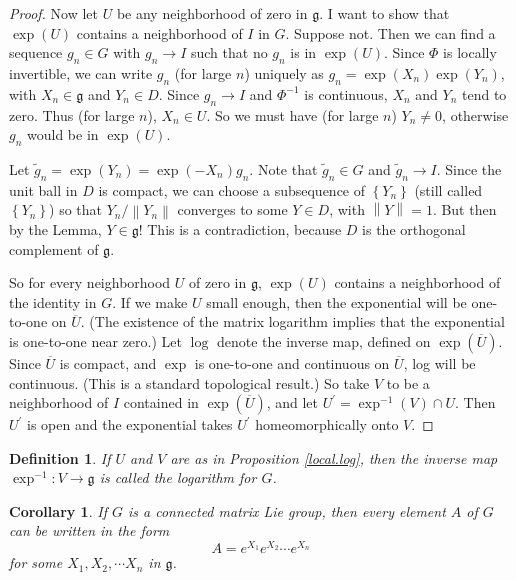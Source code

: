 \documentclass[12pt]{amsbook}
\let \frak = \mathfrak
\theoremstyle{plain}
\newtheorem{corollary}[theorem]{Corollary}
\newtheorem{definition}[theorem]{Definition}
\numberwithin{equation}{chapter}
\numberwithin{theorem}{chapter}
\begin{document}
\begin{proof}
Now let $U$ be any neighborhood of zero in $\frak{g}$. I want to show that
$\exp\left(  U\right)  $ contains a neighborhood of $I$ in $G$. Suppose not.
Then we can find a sequence $g_{n}\in G$ with $g_{n}\rightarrow I$ such that
no $g_{n}$ is in $\exp\left(  U\right)  $. Since $\Phi$ is locally invertible,
we can write $g_{n}$ (for large $n$) uniquely as $g_{n}=\exp\left(
X_{n}\right)  \exp\left(  Y_{n}\right)  $, with $X_{n}\in\frak{g}$ and
$Y_{n}\in D$. Since $g_{n}\rightarrow I$ and $\Phi^{-1}$ is continuous,
$X_{n}$ and $Y_{n}$ tend to zero. Thus (for large $n$), $X_{n}\in U$. So we
must have (for large $n$) $Y_{n}\neq0$, otherwise $g_{n}$ would be in
$\exp\left(  U\right)  $.

Let $\widetilde{g}_{n}=\exp\left(  Y_{n}\right)  =\exp\left(  -X_{n}\right)
g_{n}$. Note that $\widetilde{g}_{n}\in G$ and $\widetilde{g}_{n}\rightarrow
I$. Since the unit ball in $D$ is compact, we can choose a subsequence of
$\left\{  Y_{n}\right\}  $ (still called $\left\{  Y_{n}\right\}  $) so that
$Y_{n}/\left\|  Y_{n}\right\|  $ converges to some $Y\in D$, with $\left\|
Y\right\|  =1$. But then by the Lemma, $Y\in\frak{g}$! This is a
contradiction, because $D$ is the orthogonal complement of $\frak{g}$.

So for every neighborhood $U$ of zero in $\frak{g}$, $\exp\left(  U\right)  $
contains a neighborhood of the identity in $G$. If we make $U$ small enough,
then the exponential will be one-to-one on $\overline{U}$. (The existence of
the matrix logarithm implies that the exponential is one-to-one near zero.)
Let $\log$ denote the inverse map, defined on $\exp\left(  \overline
{U}\right)  $. Since $\overline{U}$ is compact, and $\exp$ is one-to-one and
continuous on $\overline{U}$, log will be continuous. (This is a standard
topological result.) So take $V$ to be a neighborhood of $I$ contained in
$\exp\left(  \overline{U}\right)  $, and let $U^{\prime}=\exp^{-1}\left(
V\right)  \cap U$. Then $U^{\prime}$ is open and the exponential takes
$U^{\prime}$ homeomorphically onto $V$.
\end{proof}

\begin{definition}
If $U$ and $V$ are as in Proposition \ref{local.log}, then the inverse map
$\exp^{-1}:V\rightarrow\frak{g}$ is called the logarithm for $G$.
\end{definition}

\begin{corollary}
\label{ex1.ex2}If $G$ is a connected matrix Lie group, then every element $A$
of $G$ can be written in the form
\begin{equation}
A=e^{X_{1}}e^{X_{2}}\cdots e^{X_{n}}\label{exp.n}%
\end{equation}
for some $X_{1},X_{2},\cdots X_{n}$ in $\frak{g}$.
\end{corollary}
\end{document}
